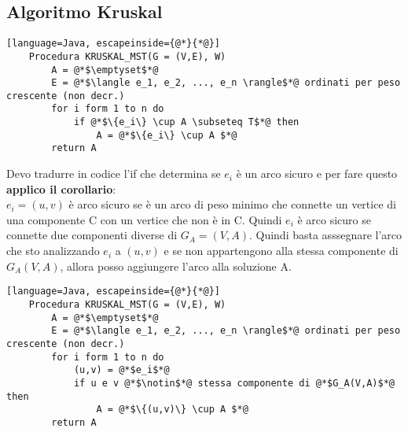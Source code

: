 \subsection{Algoritmo Kruskal}
\begin{lstlisting}[language=Java, escapeinside={@*}{*@}]
    Procedura KRUSKAL_MST(G = (V,E), W)
        A = @*$\emptyset$*@
        E = @*$\langle e_1, e_2, ..., e_n \rangle$*@ ordinati per peso crescente (non decr.)
        for i form 1 to n do
            if @*$\{e_i\} \cup A \subseteq T$*@ then
                A = @*$\{e_i\} \cup A $*@
        return A
\end{lstlisting}
Devo tradurre in codice l'if che determina se $e_i$ è un arco sicuro e per fare questo
\textbf{applico il corollario}:\\
$e_i = (u,v)$ è arco sicuro se è un arco di peso minimo che connette un vertice di una componente C
con un vertice che non è in C. Quindi $e_i$ è arco sicuro se connette due componenti diverse
di $G_A = (V,A)$. Quindi basta asssegnare l'arco che sto analizzando $e_i$ a $(u,v)$ e se
non appartengono alla stessa componente di $G_A(V,A)$, allora posso aggiungere l'arco alla soluzione A.
\begin{lstlisting}[language=Java, escapeinside={@*}{*@}]
    Procedura KRUSKAL_MST(G = (V,E), W)
        A = @*$\emptyset$*@
        E = @*$\langle e_1, e_2, ..., e_n \rangle$*@ ordinati per peso crescente (non decr.)
        for i form 1 to n do
            (u,v) = @*$e_i$*@
            if u e v @*$\notin$*@ stessa componente di @*$G_A(V,A)$*@ then
                A = @*$\{(u,v)\} \cup A $*@
        return A
\end{lstlisting}